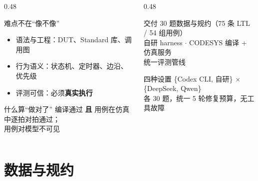 \documentclass[10pt,aspectratio=169]{beamer}
\begin{document}
\begin{frame}
  \vspace{1.4mm}
  \begin{columns}[T]
    \begin{column}{0.48\textwidth}
      \begin{alertblock}{难点不在“像不像”}
        \small
        \begin{itemize}
          \item 语法与工程：DUT、Standard 库、调用图
          \item 行为语义：状态机、定时器、边沿、优先级
          \item 评测可信：必须\textbf{真实执行}
        \end{itemize}
      \end{alertblock}
      \begin{block}{什么算“做对了”}
        \small
        编译通过 \textbf{且} 用例在仿真中逐拍对拍通过；\\
        用例对模型不可见
      \end{block}
    \end{column}
    \begin{column}{0.48\textwidth}
      \begin{block}{交付}
        \small
        30 题数据与规约（75 条 LTL / 54 组用例）\\
        自研 harness $\cdot$ CODESYS 编译 + 仿真服务\\
        统一评测管线
      \end{block}
      \begin{block}{四种设置}
        \small
        \{Codex CLI, 自研\} $\times$ \{DeepSeek, Qwen\}\\
        各 30 题，统一 5 轮修复预算，无工具故障
      \end{block}
    \end{column}
  \end{columns}

\end{frame}

\section{数据与规约}
\end{document}
